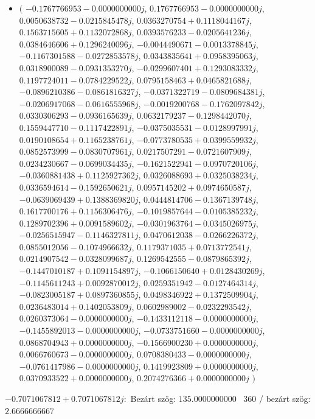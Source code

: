 \documentclass[14pt,a4paper]{article}
\begin{document}
\begin{itemize}
\item
$\big($
$-0.1767766953-0.0000000000j$, $0.1767766953-0.0000000000j$, $0.0050638732-0.0215845478j$, $0.0363270754+0.1118044167j$, $0.1563715605+0.1132072868j$, $0.0393576233-0.0205641236j$, $0.0384646606+0.1296240096j$, $-0.0044490671-0.0013378845j$, $-0.1167301588-0.0272853578j$, $0.0343835641+0.0958395063j$, $0.0318900089-0.0931353270j$, $-0.0299607401+0.1293083332j$, $0.1197724011-0.0784229522j$, $0.0795158463+0.0465821688j$, $-0.0896210386-0.0861816327j$, $-0.0371322719-0.0809684381j$, $-0.0206917068-0.0616555968j$, $-0.0019200768-0.1762097842j$, $0.0330306293-0.0936165639j$, $0.0632179237-0.1298442070j$, $0.1559447710-0.1117422891j$, $-0.0375035531-0.0128997991j$, $0.0190108654+0.1165238761j$, $-0.0773780535+0.0399559932j$, $0.0852573999-0.0830707961j$, $0.0217507291-0.0721607909j$, $0.0234230667-0.0699034435j$, $-0.1621522941-0.0970720106j$, $-0.0360881438+0.1125927362j$, $0.0326088693+0.0325038234j$, $0.0336594614-0.1592650621j$, $0.0957145202+0.0974650587j$, $-0.0639069439+0.1388369820j$, $0.0444814706-0.1367139748j$, $0.1617700176+0.1156306476j$, $-0.1019857644-0.0105385232j$, $0.1289702396+0.0091589602j$, $-0.0301963764-0.0345026975j$, $-0.0256515947-0.1146327811j$, $0.0470612038-0.0266226372j$, $0.0855012056-0.1074966632j$, $0.1179371035+0.0713772541j$, $0.0214907542-0.0328099687j$, $0.1269542555-0.0879865392j$, $-0.1447010187+0.1091154897j$, $-0.1066150640+0.0128430269j$, $-0.1145611243+0.0092870012j$, $0.0259351942-0.0127464314j$, $-0.0823005187+0.0897360855j$, $0.0498346922+0.1372509904j$, $0.0236483014+0.1402053809j$, $0.0602989002-0.0232293542j$, $0.0260373064-0.0000000000j$, $-0.1433112118-0.0000000000j$, $-0.1455892013-0.0000000000j$, $-0.0733751660-0.0000000000j$, $0.0868704943+0.0000000000j$, $-0.1566900230+0.0000000000j$, $0.0066760673-0.0000000000j$, $0.0708380433-0.0000000000j$, $-0.0761417986-0.0000000000j$, $0.1419923809+0.0000000000j$, $0.0370933522+0.0000000000j$, $0.2074276366+0.0000000000j$
$\big)$
\end{itemize}
$-0.7071067812+0.7071067812j$:\
Bezárt szög: $135.0000000000$ \
360 / bezárt szög: $2.6666666667$\
\end{document}
